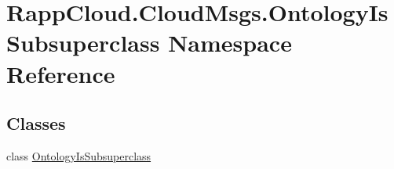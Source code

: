 \hypertarget{namespaceRappCloud_1_1CloudMsgs_1_1OntologyIsSubsuperclass}{\section{Rapp\-Cloud.\-Cloud\-Msgs.\-Ontology\-Is\-Subsuperclass Namespace Reference}
\label{namespaceRappCloud_1_1CloudMsgs_1_1OntologyIsSubsuperclass}
}
\subsection*{Classes}
\begin{DoxyCompactItemize}
\item 
class \hyperlink{classRappCloud_1_1CloudMsgs_1_1OntologyIsSubsuperclass_1_1OntologyIsSubsuperclass}{Ontology\-Is\-Subsuperclass}
\end{DoxyCompactItemize}
